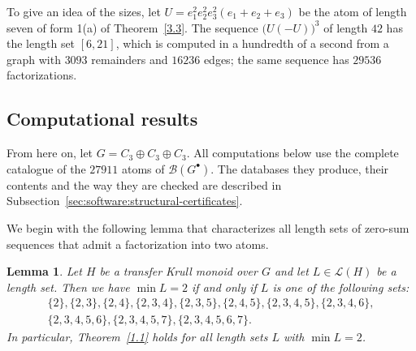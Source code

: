 \documentclass[a4paper, 10pt]{amsart}
\theoremstyle{plain}
\newtheorem{lemma}[theorem]{\bf Lemma}
\theoremstyle{definition}
\theoremstyle{definition}
\numberwithin{equation}{section}
\begin{document}
To give an idea of the sizes, let $U = e_1^2e_2^2e_3^2(e_1+e_2+e_3)$ be the
atom of length seven of form 1(a) of Theorem~\ref{3.3}.  The sequence
$\bigl(U(-U)\bigr)^3$ of length $42$ has the length set $[6,21]$, which is
computed in a hundredth of a second from a graph with $3093$ remainders and
$16236$ edges; the same sequence has $29536$ factorizations.


\subsection{Computational results}\label{sec:software:results}

From here on, let $G = C_3 \oplus C_3 \oplus C_3$.  All computations below
use the complete catalogue of the $27911$ atoms of $\mathcal B (G^\bullet)$.  The databases
they produce, their contents and the way they are checked are described in
Subsection~\ref{sec:software:structural-certificates}.

We begin with the following lemma that characterizes all length sets of
zero-sum sequences that admit a factorization into two atoms.

\begin{lemma}\label{lem:comp:length-sets-of-pairs}
	Let $H$ be a transfer Krull monoid over $G$ and let $L \in \mathcal{L}(H)$
	be a length set. Then we have $\min L = 2$ if and only if $L$ is one of the
	following sets:
	\begin{gather*}
	\{2\},\{2,3\},\{2,4\},
 	\{2,3,4\}, \{2,3,5\}, \{2,4,5\},
 	\{2,3,4,5\}, \{2,3,4,6\}, \\
 	\{2,3,4,5,6\}, \{2,3,4,5,7\}, \{2,3,4,5,6,7\}.
	\end{gather*}
	In particular, Theorem~\ref{1.1} holds for all length sets $L$ with $\min L = 2$.
\end{lemma}
\end{document}
